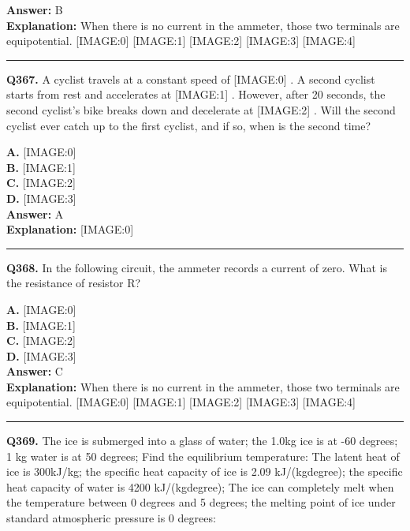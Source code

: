 \documentclass[12pt]{article}
\begin{document}
\textbf{Answer:} B \\
\textbf{Explanation:} When there is no current in the ammeter, those two terminals are equipotential.
[IMAGE:0]
[IMAGE:1]
[IMAGE:2]
[IMAGE:3]
[IMAGE:4]

\hrule
\vspace{1em}


\noindent
\textbf{Q367.} A cyclist travels at a constant speed of
[IMAGE:0]
. A second cyclist starts from rest and accelerates at
[IMAGE:1]
. However, after 20 seconds, the second cyclist's bike breaks down and decelerate at
[IMAGE:2]
. Will the second cyclist ever catch up to the first cyclist, and if so, when is the second time?



\textbf{A.} [IMAGE:0] \\
\textbf{B.} [IMAGE:1] \\
\textbf{C.} [IMAGE:2] \\
\textbf{D.} [IMAGE:3] \\

\textbf{Answer:} A \\
\textbf{Explanation:} [IMAGE:0]

\hrule
\vspace{1em}


\noindent
\textbf{Q368.} In the following circuit, the ammeter records a current of zero.
What is the resistance of resistor R?



\textbf{A.} [IMAGE:0] \\
\textbf{B.} [IMAGE:1] \\
\textbf{C.} [IMAGE:2] \\
\textbf{D.} [IMAGE:3] \\

\textbf{Answer:} C \\
\textbf{Explanation:} When there is no current in the ammeter, those two terminals are equipotential.
[IMAGE:0]
[IMAGE:1]
[IMAGE:2]
[IMAGE:3]
[IMAGE:4]

\hrule
\vspace{1em}


\noindent
\textbf{Q369.} The ice is submerged into a glass of water; the 1.0kg ice is at -60 degrees; 1 kg water is at 50 degrees; Find the equilibrium temperature: The latent heat of ice is 300kJ/kg; the specific heat capacity of ice is 2.09 kJ/(kg\cdot degree); the specific heat capacity of water is 4200 kJ/(kg\cdot degree); The ice can completely melt when the temperature between 0 degrees and 5 degrees; the melting point of ice under standard atmospheric pressure is 0 degrees:
\end{document}
